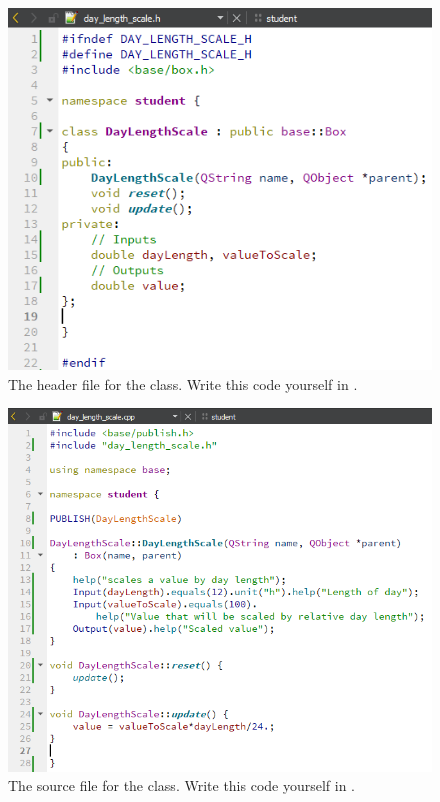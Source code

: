 \begin{figure}
\centering
\includegraphics[scale=0.7]{graphics/qt-creator-day-length-scale-h}
\caption{The header file for the  class. Write this code yourself in .}
\label{fig:qt-creator-day-length-scale-h}
\end{figure}

\begin{figure}
\centering
\includegraphics[scale=0.7]{graphics/qt-creator-day-length-scale-cpp}
\caption{The source file for the  class. Write this code yourself in .}
\label{fig:qt-creator-day-length-scale-cpp}
\end{figure}

